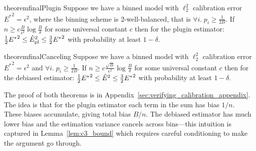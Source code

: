 
\begin{restatable}{theorem}{finalPlugin}
\label{thm:final-plugin}
  Suppose we have a binned model with $\ell_2^2$ calibration error ${E^*}^2 = \epsilon^2$, where the binning scheme is 2-well-balanced, that is $\forall i.\;p_i \geq \frac{1}{2B}$. If $n \geq c\frac{B}{\epsilon^2}\log{\frac{B}{\delta}}$ for some universal constant $c$ then for the plugin estimator: $\frac{1}{2} {E^*}^2 \leq \hat{E}_{\textup{pl}}^2{} \leq \frac{3}{2} {E^*}^2$ with probability at least $1 - \delta$.
\end{restatable}

\begin{restatable}{theorem}{finalCanceling}
\label{thm:final-ours}
  Suppose we have a binned model with $\ell_2^2$ calibration error ${E^*}^2 = \epsilon^2$ and $\forall i.\;p_i \geq \frac{1}{2B}$. If $n \geq c\frac{\sqrt{B}}{\epsilon^2}\log{\frac{B}{\delta}}$ for some universal constant $c$ then for the debiased estimator: $\frac{1}{2} {E^*}^2 \leq \hat{E}^2{} \leq \frac{3}{2}{E^*}^2$ with probability at least $1 - \delta$.
\end{restatable}


The proof of both theorems is in Appendix~\ref{sec:verifying_calibration_appendix}. The idea is that for the plugin estimator each term in the sum has bias $1/n$. These biases accumulate, giving total bias $B/n$. The debiased estimator has much lower bias and the estimation variance cancels across bins---this intuition is captured in Lemma~\ref{lem:c3_bound} which requires careful conditioning to make the argument go through.

